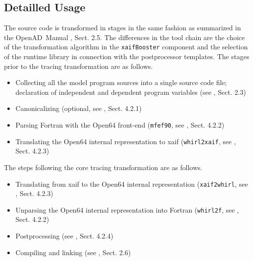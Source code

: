 \documentclass{article}
\newcommand{\openad}{OpenAD}
\begin{document}
\subsection{Detailled Usage}
The source code is transformed in stages in the same fashion as 
summarized in the \openad\ Manual \cite{userManual}, Sect. 2.5. 
The differences in the tool chain are the choice of the transformation algorithm 
in the \lstinline{xaifBooster} component and the selection of the runtime library in connection with 
the postprocessor templates. 
The stages prior to the tracing transformation are as follows.
\begin{itemize}
\item Collecting all the model program sources into a  single source code file; declaration of independent and dependent program variables (see \cite{userManual}, Sect. 2.3)
\item Canonicalizing (optional, see \cite{userManual}, Sect. 4.2.1)
\item Parsing Fortran with the Open64 front-end (\lstinline{mfef90}, see \cite{userManual}, Sect. 4.2.2)
\item Translating the Open64 internal representation to xaif (\lstinline{whirl2xaif}, see \cite{userManual}, Sect. 4.2.3)
\end{itemize}
The steps following the core tracing transformation are as follows.
\begin{itemize}
\item Translating from xaif to the Open64 internal representation (\lstinline{xaif2whirl}, see \cite{userManual}, Sect. 4.2.3)
\item Unparsing the Open64 internal representation into Fortran (\lstinline{whirl2f}, see \cite{userManual}, Sect. 4.2.2)
\item Postprocessing (see \cite{userManual}, Sect. 4.2.4)
\item Compiling and linking (see \cite{userManual}, Sect. 2.6)
\end{itemize}
\end{document}
